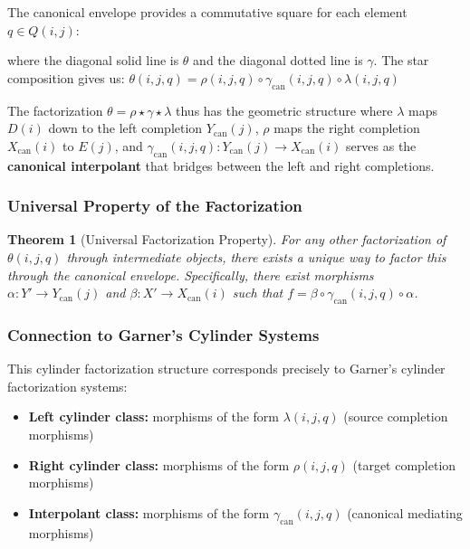 \documentclass[11pt]{article}
\theoremstyle{plain}
\newtheorem{theorem}{Theorem}[section]
\theoremstyle{definition}
\theoremstyle{remark}
\begin{document}
The canonical envelope provides a commutative square for each element $q \in Q(i,j)$:
\begin{center}
\end{center}

where the diagonal solid line is $\theta$ and the diagonal dotted line is $\gamma$. The star composition gives us:
$\theta(i,j,q) = \rho(i,j,q) \circ \gamma_{\mathrm{can}}(i,j,q) \circ \lambda(i,j,q)$

The factorization $\theta = \rho \star \gamma \star \lambda$ thus has the geometric structure where $\lambda$ maps $D(i)$ down to the left completion $Y_{\mathrm{can}}(j)$, $\rho$ maps the right completion $X_{\mathrm{can}}(i)$ to $E(j)$, and $\gamma_{\mathrm{can}}(i,j,q) : Y_{\mathrm{can}}(j) \to X_{\mathrm{can}}(i)$ serves as the \textbf{canonical interpolant} that bridges between the left and right completions.

\subsubsection{Universal Property of the Factorization}

\begin{theorem}[Universal Factorization Property]
For any other factorization of $\theta(i,j,q)$ through intermediate objects, there exists a unique way to factor this through the canonical envelope. Specifically, there exist morphisms $\alpha : Y' \to Y_{\mathrm{can}}(j)$ and $\beta : X' \to X_{\mathrm{can}}(i)$ such that $f = \beta \circ \gamma_{\mathrm{can}}(i,j,q) \circ \alpha$.
\end{theorem}

\subsubsection{Connection to Garner's Cylinder Systems}

This cylinder factorization structure corresponds precisely to Garner's cylinder factorization systems:
\begin{itemize}
\item \textbf{Left cylinder class:} morphisms of the form $\lambda(i,j,q)$ (source completion morphisms)
\item \textbf{Right cylinder class:} morphisms of the form $\rho(i,j,q)$ (target completion morphisms)  
\item \textbf{Interpolant class:} morphisms of the form $\gamma_{\mathrm{can}}(i,j,q)$ (canonical mediating morphisms)
\end{itemize}
\end{document}
